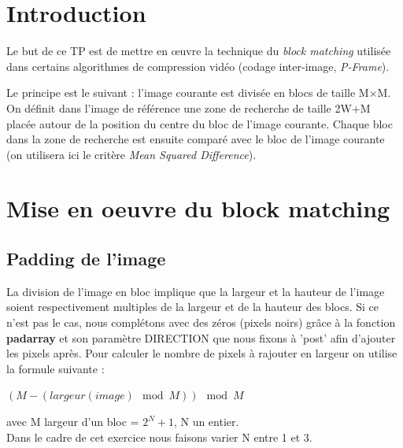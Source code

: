 \documentclass[a4paper, 12pt]{article}
\begin{document}






\clearpage

\section{Introduction}

Le but de ce TP est de mettre en œuvre la technique du \textit{block matching} utilisée dans certains algorithmes de compression vidéo (codage inter-image, \textit{P-Frame}).

Le principe est le suivant : l’image courante est divisée en blocs de taille M×M. On définit dans l’image de référence une zone de recherche de taille 2W+M placée autour de la position du centre du bloc de l’image courante. Chaque bloc dans la zone de recherche est ensuite comparé avec le bloc de l’image courante (on utilisera ici le critère \textit{Mean Squared Difference}).


\section{Mise en oeuvre du block matching}

\subsection{Padding de l'image}

La division de l'image en bloc implique que la largeur et la hauteur de l'image soient respectivement multiples de la largeur et de la hauteur des blocs. Si ce n'est pas le cas, nous complétons avec des zéros (pixels noirs) grâce à la fonction \textbf{padarray} et son paramètre DIRECTION que nous fixons à 'post' afin d'ajouter les pixels après. Pour calculer le nombre de pixels à rajouter en largeur on utilise la formule suivante : \\

\begin{center}
	$(M - (largeur(image) \mod M)) \mod M$ \\
\end{center}
avec M largeur d'un bloc = $2^N + 1$, N un entier.\\
Dans le cadre de cet exercice nous faisons varier N entre 1 et 3.\\
\end{document}
